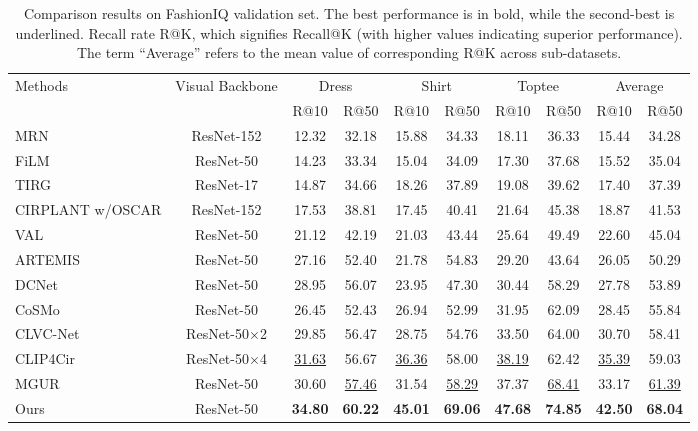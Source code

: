 \documentclass[letterpaper]{article} \usepackage{aaai24}  \usepackage{times}  \usepackage{helvet}  \usepackage{courier}  \usepackage[hyphens]{url}  \usepackage{graphicx} \urlstyle{rm} \def\UrlFont{\rm}  \usepackage{natbib}  \usepackage{caption} \frenchspacing  \setlength{\pdfpagewidth}{8.5in} \setlength{\pdfpageheight}{11in} \usepackage{amsmath,amsfonts}
\begin{document}
\begin{table*}[htb]
\centering
\small
    \begin{tabular}{l|c|cccccc|cc}
    \toprule
    \multirow{2}{*}{Methods} & \multirow{2}{*}{Visual Backbone} & \multicolumn{2}{c}{Dress} & \multicolumn{2}{c}{Shirt} & \multicolumn{2}{c}{Toptee} & \multicolumn{2}{|c}{Average}\\
    \cmidrule{3-4} \cmidrule{5-6} \cmidrule{7-8} \cmidrule{9-10}
    \multirow{2}{*}{} & \multirow{2}{*}{} &  R@10 & R@50 & R@10 & R@50 & R@10 & R@50 & R@10 & R@50\\
    \midrule
    MRN \cite{MRN} & ResNet-152 & 12.32 & 32.18 & 15.88 & 34.33 & 18.11 & 36.33 & 15.44 & 34.28 \\
    FiLM \cite{perez2018film} & ResNet-50 & 14.23 & 33.34 & 15.04 & 34.09 & 17.30 & 37.68 & 15.52 & 35.04 \\
    TIRG \cite{TIRG} & ResNet-17 & 14.87 & 34.66 & 18.26 & 37.89 & 19.08 & 39.62 & 17.40 & 37.39 \\
    CIRPLANT w/OSCAR \cite{liu2021image} & ResNet-152 & 17.53 & 38.81 & 17.45 & 40.41 & 21.64 & 45.38 & 18.87 & 41.53 \\
    VAL \cite{Chen_2020_CVPR} & ResNet-50 & 21.12 & 42.19 & 21.03 & 43.44 & 25.64 & 49.49 & 22.60 & 45.04 \\
    ARTEMIS \cite{delmas2022artemis} & ResNet-50 & 27.16 & 52.40 & 21.78 & 54.83 & 29.20 & 43.64 & 26.05 & 50.29 \\
    DCNet \cite{kim:2021:AAAI} & ResNet-50 & 28.95 & 56.07 & 23.95 & 47.30 & 30.44 & 58.29 & 27.78 & 53.89 \\
    CoSMo \cite{2021CoSMo} & ResNet-50 & 26.45 & 52.43 & 26.94 & 52.99 & 31.95 & 62.09 & 28.45 & 55.84 \\
    CLVC-Net \cite{CLVC-Net} & ResNet-50$\times$2 & 29.85 & 56.47 & 28.75 & 54.76 & 33.50 & 64.00 & 30.70 & 58.41 \\
    CLIP4Cir \cite{Baldrati2022combiner} & ResNet-50$\times$4 & \underline{31.63} & 56.67 & \underline{36.36} & 58.00 & \underline{38.19} & 62.42 & \underline{35.39} & 59.03 \\
    MGUR \cite{chen2022composed} & ResNet-50 & {{30.60}} & \underline{{57.46}} & {31.54} & \underline{58.29} & {{37.37}} & \underline{{68.41}} & {{33.17}} & \underline{{61.39}}\\
    \midrule
Ours & ResNet-50 & \textbf{{34.80}} & \textbf{{60.22}} & \textbf{45.01} & \textbf{69.06} & \textbf{{47.68}} & \textbf{{74.85}} & \textbf{{42.50}} & \textbf{{68.04}}\\
    \bottomrule
    \end{tabular}
    \caption{Comparison results on FashionIQ validation set. The best performance is in bold, while the second-best is underlined. 
    Recall rate R@K, which signifies Recall@K (with higher values indicating superior performance). 
    The term ``Average'' refers to the mean value of corresponding R@K across sub-datasets.} 
    \label{tab:Recall rates on fashionIQ}
\end{table*}
\end{document}
